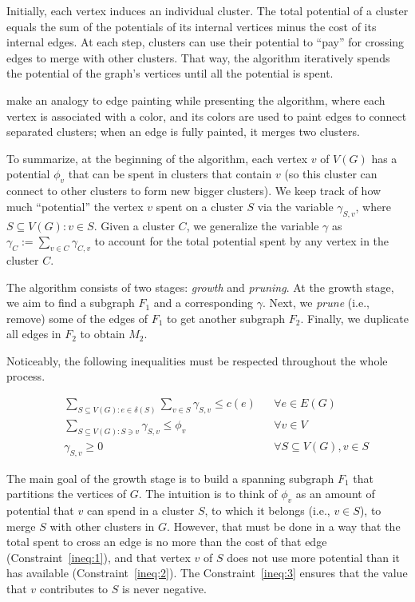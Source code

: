 Initially, each vertex induces an individual cluster. The total potential of a cluster equals the sum of the potentials of its internal vertices minus the cost of its internal edges. At each step, clusters can use their potential to ``pay'' for crossing edges to merge with other clusters. That way, the algorithm iteratively spends the potential of the graph's vertices until all the potential is spent.

\cite{Bateni} make an analogy to edge painting while presenting the algorithm, where each vertex is associated with a color, and its colors are used to paint edges to connect separated clusters; when an edge is fully painted, it merges two clusters.

To summarize, at the beginning of the algorithm, each vertex \(v\) of \(V(G)\) has a potential \(\phi_v\) that can be spent in clusters that contain \(v\) (so this cluster can connect to other clusters to form new bigger clusters). We keep track of how much ``potential'' the vertex \(v\) spent on a cluster \(S\) via the variable \(\gamma_{S, v}\), where \(S \subseteq V(G): v \in S\). Given a cluster \(C\), we generalize the variable \(\gamma\) as \(\gamma_{C}:= \sum_{v \in C} \gamma_{C, v}\) to account for the total potential spent by any vertex in the cluster \(C\).

The algorithm consists of two stages: \textit{growth} and \textit{pruning}. At the growth stage, we aim to find a subgraph \(F_1\) and a corresponding \(\gamma\). Next, we \textit{prune} (i.e., remove) some of the edges of \(F_1\) to get another subgraph \(F_2\). Finally, we duplicate all edges in \(F_2\) to obtain \(M_2\).

Noticeably, the following inequalities must be respected throughout the whole process.

\begin{align}
&&\sum_{S\subseteq V(G): e \in \delta(S)} \sum_{v \in S} \gamma_{S, v} \leq c(e) && \forall e \in E(G) \label{ineq:1} \\
&&\sum_{S \subseteq V(G): S \ni v} \gamma_{S, v} \leq \phi_v && \forall v \in V \label{ineq:2} \\
&&\gamma_{S, v} \geq 0 && \forall S \subseteq V(G), v \in S \label{ineq:3}
\end{align}

The main goal of the growth stage is to build a spanning subgraph \(F_1\) that partitions the vertices of \(G\). The intuition is to think of \(\phi_v\) as an amount of potential that \(v\) can spend in a cluster \(S\), to which it belongs (i.e., \(v \in S\)), to merge \(S\) with other clusters in \(G\). However, that must be done in a way that the total spent to cross an edge is no more than the cost of that edge (Constraint~\eqref{ineq:1}), and that vertex \(v\) of \(S\) does not use more potential than it has available (Constraint~\eqref{ineq:2}). The Constraint~\eqref{ineq:3} ensures that the value that \(v\) contributes to \(S\) is never negative.

